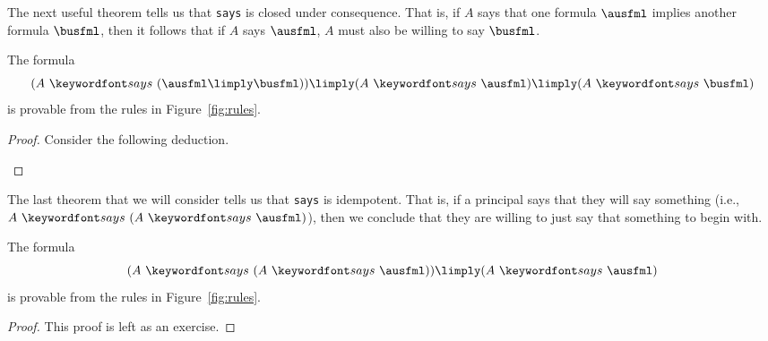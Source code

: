\documentclass[11pt,twoside]{scrartcl}
\begin{document}
The next useful theorem tells us that \verb'says' is closed under consequence. That is, if $A$ says that one formula $\ausfml$ implies another formula $\busfml$, then it follows that if $A$ says $\ausfml$, $A$ must also be willing to say $\busfml$.

\begin{theorem}
The formula 
\[
(\says{A}{(\ausfml \limply \busfml)}) \limply (\says{A}{\ausfml}) \limply (\says{A}{\busfml})
\] 
is provable from the rules in Figure~\ref{fig:rules}.
\end{theorem}
\begin{proof}
Consider the following deduction.
\begin{sequentdeduction}[array]
 {
}
\end{sequentdeduction}
\end{proof}

The last theorem that we will consider tells us that \verb'says' is idempotent. That is, if a principal says that they will say something (i.e., $\says{A}{(\says{A}{\ausfml})}$), then we conclude that they are willing to just say that something to begin with.

\begin{theorem}
The formula
\[
(\says{A}{(\says{A}{\ausfml})}) \limply (\says{A}{\ausfml})
\]
is provable from the rules in Figure~\ref{fig:rules}.
\end{theorem}
\begin{proof}
This proof is left as an exercise.
\end{proof}


\end{document}
